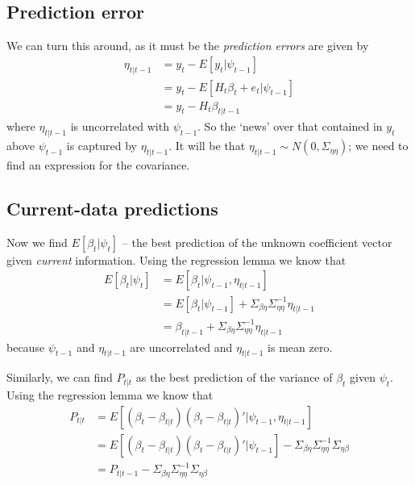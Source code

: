 \documentclass[
  letterpaper,
]{book}
\begin{document}
\hypertarget{prediction-error}{%
\subsection{Prediction error}\label{prediction-error}}

We can turn this around, as it must be the \emph{prediction errors} are
given by \begin{align}
\eta_{t|t-1} &= y_t - E[y_t|\psi_{t-1}]  \\
             &= y_t - E[H_t\beta_t+e_t|\psi_{t-1}] \\
             &= y_t-H_t\beta_{t|t-1}
\end{align} where \(\eta_{t|t-1}\) is uncorrelated with \(\psi_{t-1}\).
So the `news' over that contained in \(y_t\) above \(\psi_{t-1}\) is
captured by \(\eta_{t|t-1}\). It will be that
\(\eta_{t|t-1}\sim N(0,\Sigma_{\eta\eta})\); we need to find an
expression for the covariance.

\hypertarget{current-data-predictions}{%
\subsection{Current-data predictions}\label{current-data-predictions}}

Now we find \(E [\beta_t | \psi_t]\) -- the best prediction of the
unknown coefficient vector given \emph{current} information. Using the
regression lemma we know that \begin{align}
E[\beta_t | \psi_t ] &= E[\beta_t | \psi_{t-1}, \eta_{t|t-1} ]  \\
&= E[\beta_t | \psi_{t-1}] +\Sigma_{\beta\eta} \Sigma_{\eta\eta}^{-1}\eta_{t|t-1}  \\
&= \beta_{t|t-1} + \Sigma_{\beta\eta}\Sigma_{\eta\eta}^{-1} \eta_{t|t-1}
\end{align} because \(\psi_{t-1}\) and \(\eta_{t|t-1}\) are uncorrelated
and \(\eta_{t|t-1}\) is mean zero.

Similarly, we can find \(P_{t|t}\) as the best prediction of the
variance of \(\beta_t\) given \(\psi_t\). Using the regression lemma we
know that \begin{align}
P_{t|t} &= E[(\beta_t-\beta_{t|t})(\beta_t - \beta_{t|t})'|\psi_{t-1}, \eta_{t|t-1}] \\
        &= E[(\beta_t - \beta_{t|t})(\beta_t-\beta_{t|t})'|\psi_{t-1}] - \Sigma_{\beta\eta}\Sigma_{\eta\eta}^{-1}\Sigma_{\eta\beta} \\
        &=P_{t|t-1}-\Sigma_{\beta\eta} \Sigma_{\eta\eta}^{-1} \Sigma_{\eta\beta} 
\end{align}
\end{document}
